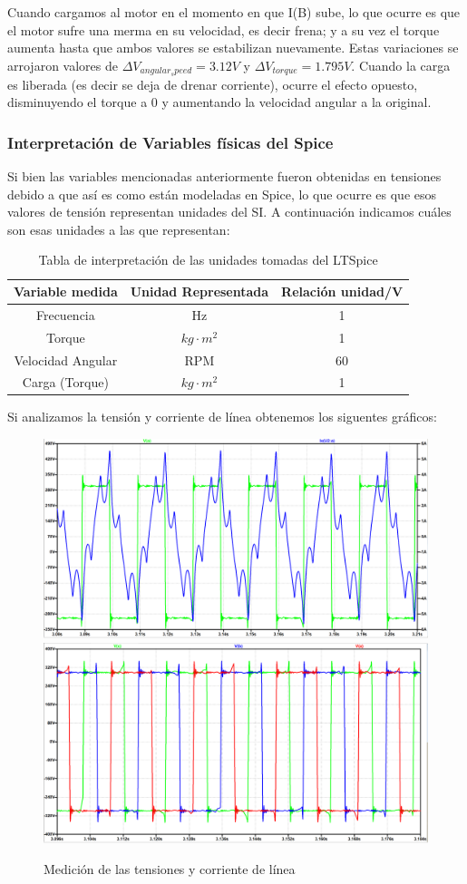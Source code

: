 \documentclass[e4_tp3_main.tex]{subfiles}
\begin{document}
Cuando cargamos al motor en el momento en que I(B) sube, lo que ocurre es que el motor sufre una merma en su velocidad, es decir frena; y a su vez el torque aumenta hasta que ambos valores se estabilizan nuevamente. Estas variaciones se arrojaron valores de $\Delta V_{angular_speed}=3.12 V$ y $\Delta V_{torque}=1.795 V$.
Cuando la carga es liberada (es decir se deja de drenar corriente), ocurre el efecto opuesto, disminuyendo el torque a 0 y aumentando la velocidad angular a la original.
\subsubsection{Interpretación de Variables físicas del Spice}
Si bien las variables mencionadas anteriormente fueron obtenidas en tensiones debido a que así es como están modeladas en Spice, lo que ocurre es que esos valores de tensión representan unidades del SI. A continuación indicamos cuáles son esas unidades a las que representan:

\begin{table}[H]
\centering
\begin{tabular}{@{}ccc@{}}

Variable medida   & Unidad Representada     & Relación unidad/V \\ \midrule
Frecuencia        & Hz                      & 1                 \\
Torque            & $kg \cdot m^2$ & 1                 \\
Velocidad Angular & RPM                     & 60                \\
Carga (Torque)    & $kg \cdot m^2$ & 1                 \\ \bottomrule
\end{tabular}
\caption{Tabla de interpretación de las unidades tomadas del LTSpice}
\end{table}

Si analizamos la tensión y corriente de línea obtenemos los siguentes gráficos:

\begin{figure}[H]
\centering
\includegraphics[width=0.45\linewidth]{Imagenes/3-1-a-linea.png}
\includegraphics[width=0.45\linewidth]{Imagenes/3-1-a-lineas.png}
\caption{Medición de las tensiones y corriente de línea}
\end{figure}
\end{document}
